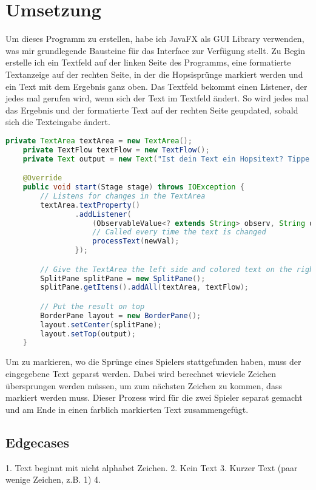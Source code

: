 \documentclass[a4paper,10pt,ngerman]{scrartcl}
\begin{document}
\section{Umsetzung}
Um dieses Programm zu erstellen, habe ich JavaFX als GUI Library verwenden, was mir grundlegende Bausteine für das Interface zur Verfügung stellt.
\newline
\newline Zu Begin erstelle ich ein Textfeld auf der linken Seite des Programms, eine formatierte Textanzeige auf der rechten Seite, in der die Hopsisprünge markiert werden und ein Text mit dem Ergebnis ganz oben.
Das Textfeld bekommt einen Listener, der jedes mal gerufen wird, wenn sich der Text im Textfeld ändert. So wird jedes mal das Ergebnis und der formatierte Text auf der rechten Seite geupdated, sobald sich die Texteingabe ändert.

\begin{lstlisting}[language=Java]
    private TextArea textArea = new TextArea();
    private TextFlow textFlow = new TextFlow();
    private Text output = new Text("Ist dein Text ein Hopsitext? Tippe in das Textfeld");

    @Override
    public void start(Stage stage) throws IOException {
        // Listens for changes in the TextArea
        textArea.textProperty()
                .addListener(
                    (ObservableValue<? extends String> observ, String old, String newVal) -> {
                    // Called every time the text is changed
                    processText(newVal);
                });

        // Give the TextArea the left side and colored text on the right side
        SplitPane splitPane = new SplitPane();
        splitPane.getItems().addAll(textArea, textFlow);

        // Put the result on top
        BorderPane layout = new BorderPane();
        layout.setCenter(splitPane);
        layout.setTop(output);
    }
\end{lstlisting}

Um zu markieren, wo die Sprünge eines Spielers stattgefunden haben, muss der eingegebene Text geparst werden. Dabei wird berechnet wieviele Zeichen
übersprungen werden müssen, um zum nächsten Zeichen zu kommen, dass markiert werden muss. Dieser Prozess wird für die zwei Spieler separat gemacht und 
am Ende in einen farblich markierten Text zusammengefügt.

\subsection*{Edgecases}
1. Text beginnt mit nicht alphabet Zeichen. 2. Kein Text 3. Kurzer Text (paar wenige Zeichen, z.B. 1) 4. 
\end{document}
